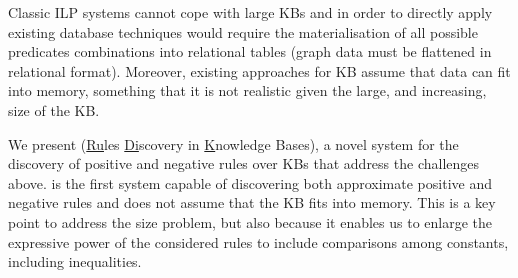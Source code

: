 Classic ILP systems cannot cope with large KBs and in order to directly apply existing database techniques would require the materialisation of all possible predicates combinations into relational tables (graph data must be flattened in relational format).  Moreover, existing approaches for KB assume that data can fit into memory, something that it is not realistic given the large, and increasing, size of the KB.
 

\vspace{1ex}
We present \krd (\underline{Ru}les \underline{Di}scovery in \underline{K}nowledge Bases), a novel system for the discovery of positive and negative rules %
over KBs that address the challenges above.  
\krd is the first system capable of discovering both approximate positive and negative rules and
does not assume that the KB fits into memory.
This is a key point to address the size problem, but also because it enables us to enlarge the expressive power of the considered rules to include comparisons among constants, including inequalities.


